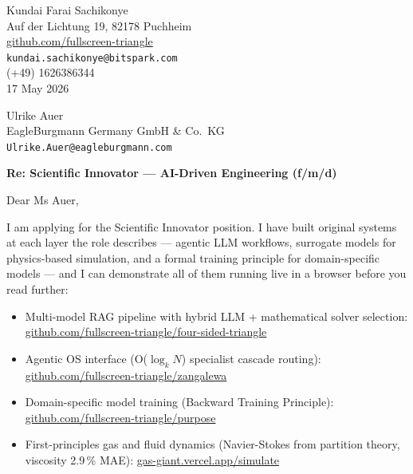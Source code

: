 \documentclass[12pt,a4paper]{article}
\begin{document}
\begin{flushright}
Kundai Farai Sachikonye \\
Auf der Lichtung 19, 82178 Puchheim \\
\href{https://github.com/fullscreen-triangle}{github.com/fullscreen-triangle} \\
\texttt{kundai.sachikonye@bitspark.com} \\
(+49) 1626386344 \\[6pt]
17 May 2026
\end{flushright}

\vspace{1em}

Ulrike Auer \\
EagleBurgmann Germany GmbH \& Co.\ KG \\
\texttt{Ulrike.Auer@eagleburgmann.com}

\vspace{1.5em}

\textbf{Re: Scientific Innovator --- AI-Driven Engineering (f/m/d)}

\vspace{1em}

Dear Ms Auer,

I am applying for the Scientific Innovator position. I have built original
systems at each layer the role describes --- agentic LLM workflows, surrogate
models for physics-based simulation, and a formal training principle for
domain-specific models --- and I can demonstrate all of them running live in
a browser before you read further:

\begin{itemize}
  \item Multi-model RAG pipeline with hybrid LLM + mathematical solver selection:
    \href{https://github.com/fullscreen-triangle/four-sided-triangle}{github.com/fullscreen-triangle/four-sided-triangle}
  \item Agentic OS interface (O($\log_k N$) specialist cascade routing):
    \href{https://github.com/fullscreen-triangle/zangalewa}{github.com/fullscreen-triangle/zangalewa}
  \item Domain-specific model training (Backward Training Principle):
    \href{https://github.com/fullscreen-triangle/purpose}{github.com/fullscreen-triangle/purpose}
  \item First-principles gas and fluid dynamics (Navier-Stokes from partition theory, viscosity 2.9\,\% MAE):
    \href{https://gas-giant.vercel.app/simulate}{gas-giant.vercel.app/simulate}
\end{itemize}
\end{document}
